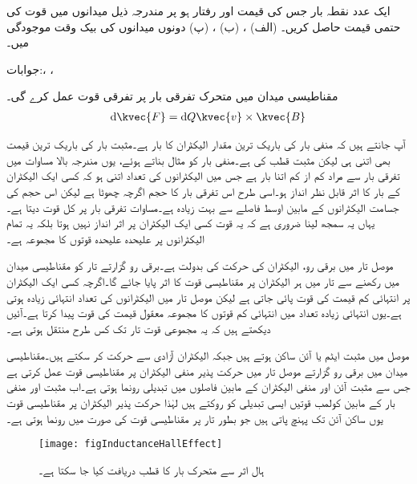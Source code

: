 ایک عدد نقطہ بار جس کی قیمت  اور رفتار  ہو پر مندرجہ ذیل میدانوں میں قوت کی حتمی قیمت حاصل کریں۔
(الف) ، (ب) ، (پ) دونوں میدانوں کی بیک وقت موجودگی میں۔

جوابات:،  ، 

مقناطیسی میدان میں متحرک تفرقی بار  پر تفرقی قوت  عمل کرے گی۔  
\begin{align}\label{مساوات_امالہ_مقناطیسی_تفرقی_قوت}
\dif \kvec{F}=\dif Q \kvec{v} \times \kvec{B}
\end{align}

آپ جانتے ہیں کہ منفی بار کی باریک ترین مقدار الیکٹران کا بار ہے۔مثبت بار کی باریک ترین قیمت بھی اتنی ہی لیکن مثبت قطب کی ہے۔منفی بار کو مثال بناتے ہوئے، یوں مندرجہ بالا مساوات میں تفرقی بار سے مراد کم از کم اتنا بار ہے جس میں الیکٹرانوں کی تعداد اتنی ہو کہ کسی ایک الیکٹران کے بار کا اثر قابل نظر انداز ہو۔اسی طرح اس تفرقی بار کا حجم اگرچہ چھوٹا ہے لیکن اس حجم کی جسامت الیکٹرانوں کے مابین اوسط فاصلے سے بہت زیادہ ہے۔مساوات  تفرقی بار پر کل قوت دیتا ہے۔یہاں یہ سمجھ لینا ضروری ہے کہ یہ قوت کسی ایک الیکٹران پر اثر انداز نہیں ہوتا بلکہ یہ تمام الیکٹرانوں پر علیحدہ علیحدہ قوتوں کا مجموعہ ہے۔ 

موصل تار میں برقی رو، الیکٹران کی حرکت کی بدولت ہے۔برقی رو گزارتے تار کو مقناطیسی میدان میں رکھنے سے تار میں ہر الیکٹران پر مقناطیسی قوت کا اثر پایا جائے گا۔اگرچہ کسی ایک الیکٹران پر انتہائی کم قیمت کی قوت پائی جاتی ہے لیکن موصل تار میں الیکٹرانوں کی تعداد انتہائی زیادہ ہوتی ہے۔یوں انتہائی زیادہ تعداد میں انتہائی کم قوتوں کا مجموعہ معقول قیمت کی قوت پیدا کرتا ہے۔آئیں دیکھتے ہیں کہ یہ مجموعی قوت تار تک کس طرح منتقل ہوتی ہے۔

موصل میں مثبت ایٹم یا آئن ساکن ہوتے ہیں جبکہ الیکٹران آزادی سے حرکت کر سکتے ہیں۔مقناطیسی میدان میں برقی رو گزارتے موصل تار میں حرکت پذیر منفی الیکٹران پر مقناطیسی قوت عمل کرتی ہے جس سے مثبت آئن اور منفی الیکٹران کے مابین فاصلوں میں تبدیلی رونما ہوتی ہے۔اب مثبت اور منفی بار کے مابین کولمب قوتیں ایسی تبدیلی کو روکتے ہیں لہٰذا حرکت پذیر الیکٹران پر مقناطیسی قوت یوں ساکن آئن تک پہنچ پاتی ہیں جو بطور تار پر مقناطیسی قوت کی صورت میں رونما ہوتی ہے۔

\begin{figure}
\centering
\texttt{[image: figInductanceHallEffect]}
\caption{ہال اثر سے متحرک بار کا قطب دریافت کیا جا سکتا ہے۔}
\label{شکل_امالہ_ہال_قطب_کا_حصول}
\end{figure}

